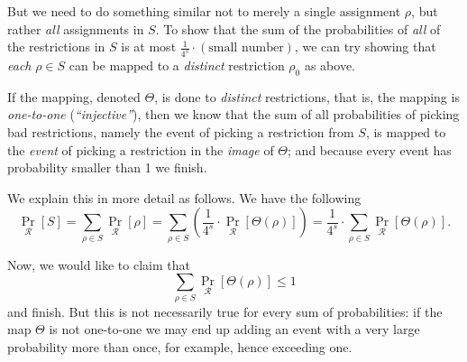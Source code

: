 But we need to do something similar not to merely a single assignment \( \rho \), but rather \emph{all} assignments in  \( S \).
To show that the sum of the probabilities of \emph{all} of the restrictions in \( S \) is at most 
\(\frac{1}{4^s} \cdot (\text{small number})\), we can try showing that \emph{each} \( \rho \in S \) can be mapped to a 
\emph{distinct} restriction \( \rho_0 \) as above. 

If the mapping, denoted \( \Theta \), is done to \emph{distinct} restrictions, that is, the mapping is 
\emph{one-to-one} (\emph{``injective''}), then we know that the sum of all probabilities of picking bad restrictions, 
namely the event of picking a restriction from \( S \), is mapped to the \emph{event} of picking a restriction in the 
\emph{image} of \( \Theta \); and
because every event has probability smaller than 1 we finish. 

We explain this in more detail as follows. We have the following 
\[
\Pr_{\mathcal{R}}[S] = \sum_{\rho \in S} \Pr_{\mathcal{R}}[\rho] = 
\sum_{\rho \in S} \left(\frac{1}{4^s} \cdot \Pr_{\mathcal{R}}[\Theta(\rho)]\right) =
\frac{1}{4^s} \cdot \sum_{\rho \in S} \Pr_{\mathcal{R}}[\Theta(\rho)].
\]

Now, we would  like to claim that 
\[
\sum_{\rho \in S} \Pr_{\mathcal{R}}[\Theta(\rho)] \leq 1
\]
and finish. But this is not necessarily true for every sum of probabilities: if the map \( \Theta \) is 
not one-to-one we may end up adding an event with a very large probability more than once, for example, 
hence exceeding one.  




